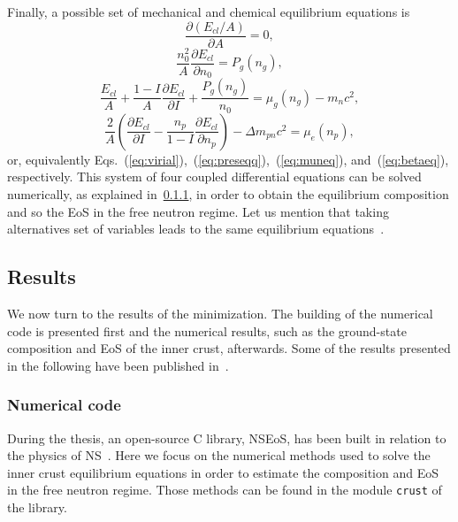 Finally, a possible set of mechanical and chemical equilibrium equations is
%
\begin{equation}
  \frac{\partial (E_{cl}/A)}{\partial A} = 0,\label{eq:ic1}
\end{equation}
%
\begin{equation}
  \frac{n_0^2}{A}\frac{\partial E_{cl}}{\partial n_0} = P_g(n_g),\label{eq:ic2}
\end{equation}
%
\begin{equation}
  \frac{E_{cl}}{A} + \frac{1-I}{A}\frac{\partial E_{cl}}{\partial I} +
  \frac{P_g(n_g)}{n_0} = \mu_g(n_g) - m_nc^2,\label{eq:ic3}
\end{equation}
%
\begin{equation}
  \frac{2}{A}\left(\frac{\partial E_{cl}}{\partial I} -
  \frac{n_p}{1-I}\frac{\partial E_{cl}}{\partial n_p}\right) - \Delta
  m_{pn}c^2 = \mu_e(n_p),\label{eq:ic4}
\end{equation}
%
or, equivalently
Eqs.~(\ref{eq:virial}),~(\ref{eq:preseqq}),~(\ref{eq:muneq}), and~(\ref{eq:betaeq}), 
respectively.
This system of four coupled differential equations can be solved numerically, as
explained in~\ref{subsubsec:numcode}, in order to obtain the equilibrium
composition and so the EoS in the free neutron regime.
Let us mention that taking alternatives set of variables leads to the 
same equilibrium equations~\cite{Haensel2007,Vinas2017}.

\subsection{Results}\label{subsec:results_icrust}

We now turn to the results of the minimization. 
The building of the numerical code is presented first and the numerical results, 
such as the ground-state composition and EoS of the inner crust, afterwards. 
{Some of the results presented in the following have been published
in~\cite{Carreau2019cc,Carreau2019moi,Carreau2019}.}

\subsubsection{Numerical code}\label{subsubsec:numcode}

During the thesis, an open-source C library, NSEoS, has been built in relation 
to the physics of NS~\cite{NSEoS}. Here we focus 
on the numerical methods used to solve the inner crust equilibrium equations 
in order to estimate the composition and EoS in the free neutron regime. Those 
methods can be found in the module \verb|crust| of the library.

